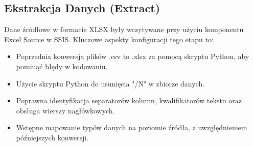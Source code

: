 \documentclass[a4paper,12pt]{article}
\begin{document}
\subsection{Ekstrakcja Danych (Extract)}
Dane źródłowe w formacie XLSX były wczytywane przy użyciu komponentu Excel Source w SSIS. Kluczowe aspekty konfiguracji tego etapu to:
\begin{itemize}
  \item Poprzednia konwersja plików .csv to .xlsx za pomocą skryptu Python, aby pominąć błędy w kodowaniu.
  \item Użycie skryptu Python do usunięcia "/N" w zbiorze danych.
  \item Poprawna identyfikacja separatorów kolumn, kwalifikatorów tekstu oraz obsługa wierszy nagłówkowych.
  \item Wstępne mapowanie typów danych na poziomie źródła, z uwzględnieniem późniejszych konwersji.
\end{itemize}
\end{document}
